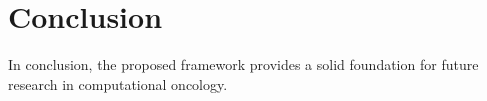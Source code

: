 \section{Conclusion}
In conclusion, the proposed framework provides a solid foundation for future research in computational oncology.
